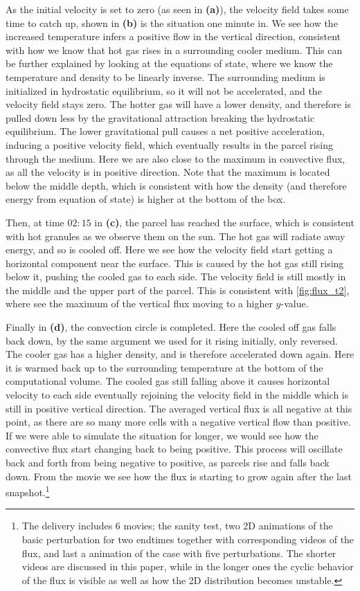 \documentclass[11pt,a4paper,twocolumn,titlepage]{article}
\begin{document}
As the initial velocity is set to zero (as seen in \textbf{(a)}), the velocity field takes some time to catch up, shown in \textbf{(b)} is the situation one minute in. We see how the increased temperature infers a positive flow in the vertical direction, consistent with how we know that hot gas rises in a surrounding cooler medium. This can be further explained by looking at the equations of state, where we know the temperature and density to be linearly inverse. The surrounding medium is initialized in hydrostatic equilibrium, so it will not be accelerated, and the velocity field stays zero. The hotter gas will have a lower density, and therefore is pulled down less by the gravitational attraction breaking the hydrostatic equilibrium. The lower gravitational pull causes a net positive acceleration, inducing a positive velocity field, which eventually results in the parcel rising through the medium. Here we are also close to the maximum in convective flux, as all the velocity is in positive direction. Note that the maximum is located below the middle depth, which is consistent with how the density (and therefore energy from equation of state) is higher at the bottom of the box.

Then, at time $02:15$ in \textbf{(c)}, the parcel has reached the surface, which is consistent with hot granules as we observe them on the sun. The hot gas will radiate away energy, and so is cooled off. Here we see how the velocity field start getting a horizontal component near the surface. This is caused by the hot gas still rising below it, pushing the cooled gas to each side. The velocity field is still mostly in the middle and the upper part of the parcel. This is consistent with \cref{fig:flux_t2}, where see the maximum of the vertical flux moving to a higher $y$-value.

Finally in \textbf{(d)}, the convection circle is completed. Here the cooled off gas falls back down, by the same argument we used for it rising initially, only reversed. The cooler gas has a higher density, and is therefore accelerated down again. Here it is warmed back up to the surrounding temperature at the bottom of the computational volume. The cooled gas still falling above it causes horizontal velocity to each side eventually rejoining the velocity field in the middle which is still in positive vertical direction. The averaged vertical flux is all negative at this point, as there are so many more cells with a negative vertical flow than positive. If we were able to simulate the situation for longer, we would see how the convective flux start changing back to being positive. This process will oscillate back and forth from being negative to positive, as parcels rise and falls back down. From the movie we see how the flux is starting to grow again after the last snapshot.\footnote{The delivery includes 6 movies; the sanity test, two 2D animations of the basic perturbation for two endtimes together with corresponding videos of the flux, and last a animation of the case with five perturbations. The shorter videos are discussed in this paper, while in the longer ones the cyclic behavior of the flux is visible as well as how the 2D distribution becomes unstable.}
\end{document}
